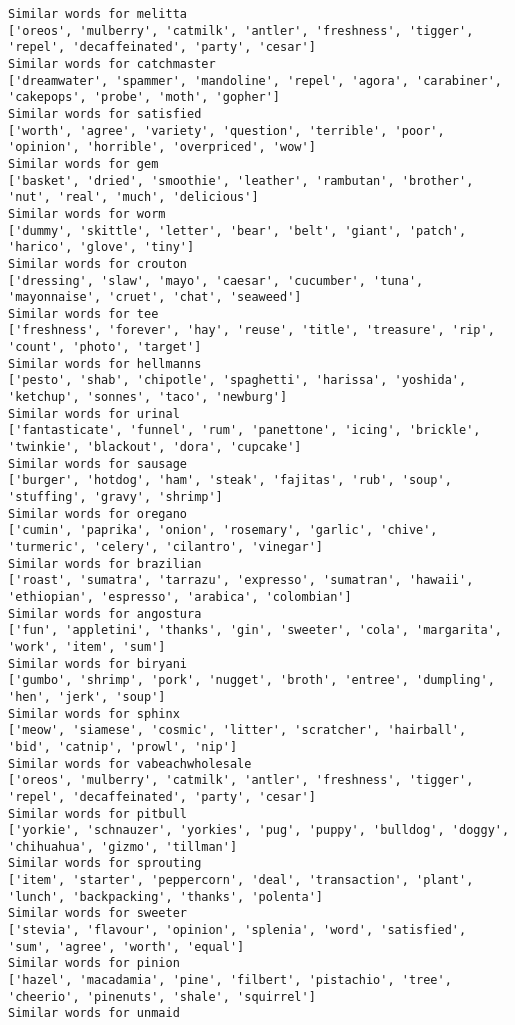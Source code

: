 \documentclass[11pt]{article}
\begin{document}
\begin{Verbatim}[commandchars=\\\{\}]
Similar words for melitta
['oreos', 'mulberry', 'catmilk', 'antler', 'freshness', 'tigger', 'repel', 'decaffeinated', 'party', 'cesar']
Similar words for catchmaster
['dreamwater', 'spammer', 'mandoline', 'repel', 'agora', 'carabiner', 'cakepops', 'probe', 'moth', 'gopher']
Similar words for satisfied
['worth', 'agree', 'variety', 'question', 'terrible', 'poor', 'opinion', 'horrible', 'overpriced', 'wow']
Similar words for gem
['basket', 'dried', 'smoothie', 'leather', 'rambutan', 'brother', 'nut', 'real', 'much', 'delicious']
Similar words for worm
['dummy', 'skittle', 'letter', 'bear', 'belt', 'giant', 'patch', 'harico', 'glove', 'tiny']
Similar words for crouton
['dressing', 'slaw', 'mayo', 'caesar', 'cucumber', 'tuna', 'mayonnaise', 'cruet', 'chat', 'seaweed']
Similar words for tee
['freshness', 'forever', 'hay', 'reuse', 'title', 'treasure', 'rip', 'count', 'photo', 'target']
Similar words for hellmanns
['pesto', 'shab', 'chipotle', 'spaghetti', 'harissa', 'yoshida', 'ketchup', 'sonnes', 'taco', 'newburg']
Similar words for urinal
['fantasticate', 'funnel', 'rum', 'panettone', 'icing', 'brickle', 'twinkie', 'blackout', 'dora', 'cupcake']
Similar words for sausage
['burger', 'hotdog', 'ham', 'steak', 'fajitas', 'rub', 'soup', 'stuffing', 'gravy', 'shrimp']
Similar words for oregano
['cumin', 'paprika', 'onion', 'rosemary', 'garlic', 'chive', 'turmeric', 'celery', 'cilantro', 'vinegar']
Similar words for brazilian
['roast', 'sumatra', 'tarrazu', 'expresso', 'sumatran', 'hawaii', 'ethiopian', 'espresso', 'arabica', 'colombian']
Similar words for angostura
['fun', 'appletini', 'thanks', 'gin', 'sweeter', 'cola', 'margarita', 'work', 'item', 'sum']
Similar words for biryani
['gumbo', 'shrimp', 'pork', 'nugget', 'broth', 'entree', 'dumpling', 'hen', 'jerk', 'soup']
Similar words for sphinx
['meow', 'siamese', 'cosmic', 'litter', 'scratcher', 'hairball', 'bid', 'catnip', 'prowl', 'nip']
Similar words for vabeachwholesale
['oreos', 'mulberry', 'catmilk', 'antler', 'freshness', 'tigger', 'repel', 'decaffeinated', 'party', 'cesar']
Similar words for pitbull
['yorkie', 'schnauzer', 'yorkies', 'pug', 'puppy', 'bulldog', 'doggy', 'chihuahua', 'gizmo', 'tillman']
Similar words for sprouting
['item', 'starter', 'peppercorn', 'deal', 'transaction', 'plant', 'lunch', 'backpacking', 'thanks', 'polenta']
Similar words for sweeter
['stevia', 'flavour', 'opinion', 'splenia', 'word', 'satisfied', 'sum', 'agree', 'worth', 'equal']
Similar words for pinion
['hazel', 'macadamia', 'pine', 'filbert', 'pistachio', 'tree', 'cheerio', 'pinenuts', 'shale', 'squirrel']
Similar words for unmaid

\end{Verbatim}
\end{document}
